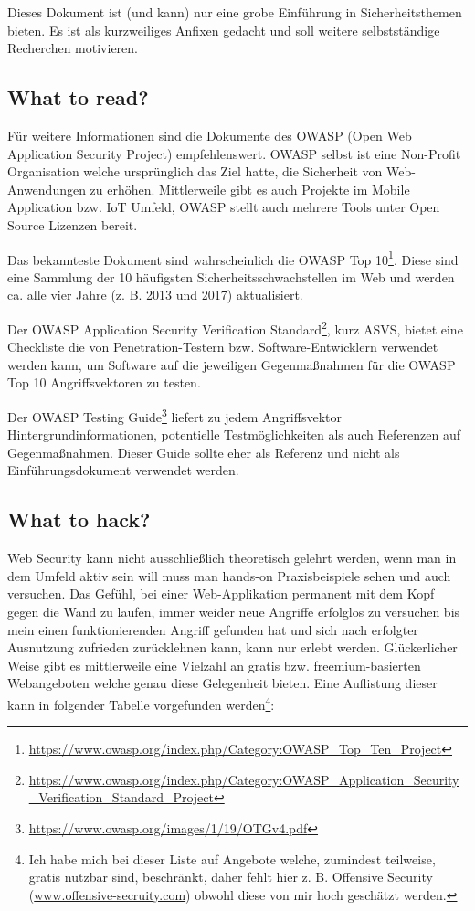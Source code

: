 Dieses Dokument ist (und kann) nur eine grobe Einführung in Sicherheitsthemen bieten. Es ist als kurzweiliges Anfixen gedacht und soll weitere selbstständige Recherchen motivieren.

\subsection{What to read?}

Für weitere Informationen sind die Dokumente des OWASP (Open Web Application Security Project) empfehlenswert. OWASP selbst ist eine Non-Profit Organisation welche ursprünglich das Ziel hatte, die Sicherheit von Web-Anwendungen zu erhöhen. Mittlerweile gibt es auch Projekte im Mobile Application bzw. IoT Umfeld, OWASP stellt auch mehrere Tools unter Open Source Lizenzen bereit.

Das bekannteste Dokument sind wahrscheinlich die OWASP Top 10\footnote{\url{https://www.owasp.org/index.php/Category:OWASP_Top_Ten_Project}}. Diese sind eine Sammlung der 10 häufigsten Sicherheitsschwachstellen im Web und werden ca. alle vier Jahre (z. B. 2013 und 2017) aktualisiert.

Der OWASP Application Security Verification Standard\footnote{\url{https://www.owasp.org/index.php/Category:OWASP_Application_Security_Verification_Standard_Project}}, kurz ASVS, bietet eine Checkliste die von Penetration-Testern bzw. Software-Entwicklern verwendet werden kann, um Software auf die jeweiligen Gegenmaßnahmen für die OWASP Top 10 Angriffsvektoren zu testen.

Der OWASP Testing Guide\footnote{\url{https://www.owasp.org/images/1/19/OTGv4.pdf}} liefert zu jedem Angriffsvektor Hintergrundinformationen, potentielle Testmöglichkeiten als auch Referenzen auf Gegenmaßnahmen. Dieser Guide sollte eher als Referenz und nicht als Einführungsdokument verwendet werden.

\subsection{What to hack?}

Web Security kann nicht ausschließlich theoretisch gelehrt werden, wenn man in dem Umfeld aktiv sein will muss man hands-on Praxisbeispiele sehen und auch versuchen. Das Gefühl, bei einer Web-Applikation permanent mit dem Kopf gegen die Wand zu laufen, immer weider neue Angriffe erfolglos zu versuchen bis mein einen funktionierenden Angriff gefunden hat und sich nach erfolgter Ausnutzung zufrieden zurücklehnen kann, kann nur erlebt werden. Glückerlicher Weise gibt es mittlerweile eine Vielzahl an gratis bzw. freemium-basierten Webangeboten welche genau diese Gelegenheit bieten. Eine Auflistung dieser kann in folgender Tabelle vorgefunden werden\footnote{Ich habe mich bei dieser Liste auf Angebote welche, zumindest teilweise, gratis nutzbar sind, beschränkt, daher fehlt hier z. B. Offensive Security (\url{www.offensive-secruity.com}) obwohl diese von mir hoch geschätzt werden.}:


